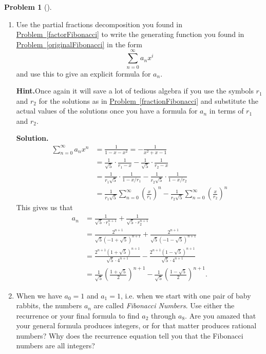 \documentclass[10pt,]{book}
\theoremstyle{plain}
\theoremstyle{definition}
\newtheorem{activity}[project]{Problem}
\theoremstyle{definition}
\numberwithin{equation}{chapter}
\newcommand{\amp}{&}
\begin{document}
\begin{activity}[]\label{solveFibonacci}
\leavevmode%
\begin{enumerate}[font=\bfseries,label=(\alph*),ref=\alph*]
\item\label{task-156} Use the partial fractions decomposition you found in \hyperref[factorFibonacci]{Problem~\ref{factorFibonacci}} to write the generating function you found in \hyperref[originalFibonacci]{Problem~\ref{originalFibonacci}} in the form%
\begin{equation*}
\sum_{n=0}^\infty a_nx^i
\end{equation*}
and use this to give an explicit formula for \(a_n\).%
\par\medskip\noindent%
\textbf{Hint.}\quad Once again it will save a lot of tedious algebra if you use the symbols \(r_1\) and \(r_2\) for the solutions as in \hyperref[fractionFibonacci]{Problem~\ref{fractionFibonacci}} and substitute the actual values of the solutions once you have a formula for \(a_n\) in terms of \(r_1\) and \(r_2\).%
\par\medskip\noindent%
\textbf{Solution.}\quad %
\begin{align*}
\sum_{n=0}^\infty a_nx^n  \amp= \frac{1}{1-x-x^2}= -\frac{1}{x^2+x-1}\\
\amp= \frac{1}{\sqrt{5}}\cdot\frac{1}{r_1-x} -\frac{1}{\sqrt{5}}\cdot\frac{1}{r_2-x}\\
\amp= \frac{1}{r_1\sqrt{5}}\cdot\frac{1}{1-x/r_1} -\frac{1}{r_2\sqrt{5}}\cdot\frac{1}{1-x/r_2}\\
\amp= \frac{1}{r_1\sqrt{5}}\sum_{n=0}^\infty\left(\frac{x}{r_1}\right)^n
-\frac{1}{r_2\sqrt{5}}\sum_{n=0}^\infty  \left(\frac{x}{r_2}\right)^n
\end{align*}
This gives us that%
\begin{align*}
a_n \amp= \frac{1}{\sqrt{5}\cdot r_1^{n+1}}
+\frac{1}{\sqrt{5}\cdot r_2^{n+1}}\\
\amp= \frac{2^{n+1}}{\sqrt{5}(-1+\sqrt{5})^{n+1}}
+
\frac{2^{n+1}}{\sqrt{5}(-1-\sqrt{5})^{n+1}}\\
\amp= \frac{2^{n+1}(1+\sqrt{5})^{n+1}}{\sqrt{5}\cdot
4^{n+1}}-
\frac{2^{n+1}(1-\sqrt{5})^{n+1}}{\sqrt{5}\cdot4^{n+1}}\\
\amp= \frac{1}{\sqrt{5}}\left(\frac{1+\sqrt{5}}{2}\right)^{n+1}-
\frac{1}{\sqrt{5}}\left(\frac{1-\sqrt{5}}{2}\right)^{n+1}.
\end{align*}
%
\item\label{task-157} When we have \(a_0=1\) and \(a_1=1\), i.e. when we start with one pair of baby rabbits, the numbers \(a_n\) are called \emph{Fibonacci Numbers}.  Use either the recurrence or your final formula to find \(a_2\) through \(a_8\).  Are you amazed that your general formula produces integers, or for that matter produces rational numbers?  Why does the recurrence equation tell you that the Fibonacci numbers are all integers?%

\end{enumerate}
\end{activity}
\end{document}
